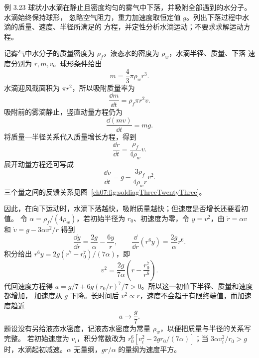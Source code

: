 \begin{origexamplebox}{例 3.23}
球状小水滴在静止且密度均匀的雾气中下落，并吸附全部遇到的水分子。水滴始终保持球形，
忽略空气阻力，重力加速度取恒定值 $g$。列出下落过程中水滴的质量、速度、半径所满足的
方程，并定性分析水滴运动；不要求求解运动方程。
\end{origexamplebox}

\begin{xesolution}
记雾气中水分子的质量密度为 $\rho_f$，液态水的密度为 $\rho_w$，水滴半径、质量、下落
速度分别为 $r,m,v$。球形条件给出
\[
 \boxed{m=\frac43\pi\rho_w r^3}.
\]
水滴迎风截面积为 $\pi r^2$，所以吸附质量率为
\[
 \boxed{\frac{\dd m}{\dd t}=\rho_f\pi r^2v}.
\]
吸附前的雾滴静止，竖直动量方程仍为
\[
 \boxed{\frac{\dd(mv)}{\dd t}=mg}.
\]
将质量—半径关系代入质量增长方程，得到
\[
 \boxed{\frac{\dd r}{\dd t}=\frac{\rho_f}{4\rho_w}v}.
\]
展开动量方程还可写成
\[
 \boxed{
 \frac{\dd v}{\dd t}
 =g-\frac{3\rho_f}{4\rho_w r}v^2}.
\]
三个量之间的反馈关系见图~\ref{ch07:fig:soldiagThreeTwentyThree}。

\soldiagThreeTwentyThree
因此，在向下运动时，水滴下落越快，吸附质量越快；但速度是否增长还要看初值。
令 $\alpha=\rho_f/(4\rho_w)$，若初始半径为 $r_0$、初速度为零，令 $y=v^2$，由
$\dot r=\alpha v$ 和 $\dot v=g-3\alpha v^2/r$ 得到
\[
 \frac{\dd y}{\dd r}=\frac{2g}{\alpha}-\frac{6y}{r},\qquad
 \frac{\dd}{\dd r}(r^6y)=\frac{2g}{\alpha}r^6.
\]
积分给出 $r^6y=2g(r^7-r_0^7)/(7\alpha)$，即
\[
 v^2=\frac{2g}{7\alpha}\left(r-\frac{r_0^7}{r^6}\right).
\]
代回速度方程得 $a=g/7+6g(r_0/r)^7/7>0$。所以这一初值下半径、质量和速度都增加，
加速度从 $g$ 下降。长时间后 $v^2\propto r$，速度不会趋于有限终端值，而加速度趋近
\[
 \boxed{a\to\frac{g}{7}}.
\]
题设没有另给液态水密度，记液态水密度为常量 $\rho_w$，以便把质量与半径的关系写完整。
若初始速度为 $v_i$，积分常数改为 $r_0^6[v_i^2-2gr_0/(7\alpha)]$；当
$3\alpha v_i^2/r_0>g$ 时，水滴起初减速。$\alpha$ 无量纲，$gr/\alpha$ 的量纲为速度平方。
\end{xesolution}
